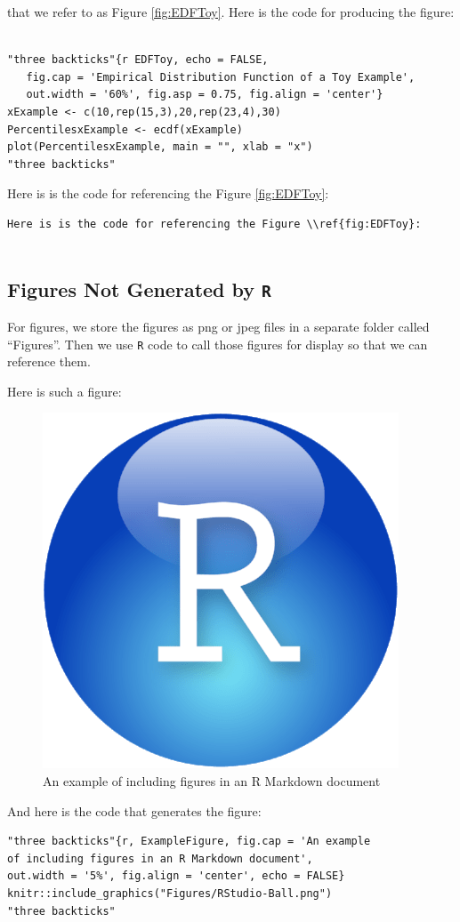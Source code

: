 \documentclass[]{book}
\theoremstyle{definition}
\theoremstyle{definition}
\theoremstyle{definition}
\theoremstyle{remark}
\begin{document}
that we refer to as Figure \ref{fig:EDFToy}. Here is the code for
producing the figure:

\begin{verbatim}

"three backticks"{r EDFToy, echo = FALSE, 
   fig.cap = 'Empirical Distribution Function of a Toy Example',
   out.width = '60%', fig.asp = 0.75, fig.align = 'center'}
xExample <- c(10,rep(15,3),20,rep(23,4),30)
PercentilesxExample <- ecdf(xExample)
plot(PercentilesxExample, main = "", xlab = "x")
"three backticks"
\end{verbatim}

Here is is the code for referencing the Figure \ref{fig:EDFToy}:

\begin{verbatim}
Here is is the code for referencing the Figure \\ref{fig:EDFToy}:
    
\end{verbatim}

\subsection{\texorpdfstring{Figures Not Generated by
\texttt{R}}{Figures Not Generated by R}}\label{figures-not-generated-by-r}

For figures, we store the figures as png or jpeg files in a separate
folder called ``Figures''. Then we use \texttt{R} code to call those
figures for display so that we can reference them.

Here is such a figure:

\begin{figure}

{\centering \includegraphics[width=0.05\linewidth]{Figures/RStudio-Ball} 

}

\caption{An example of including figures in an R Markdown document}\label{fig:ExampleFigure}
\end{figure}

And here is the code that generates the figure:

\begin{verbatim}
"three backticks"{r, ExampleFigure, fig.cap = 'An example 
of including figures in an R Markdown document', 
out.width = '5%', fig.align = 'center', echo = FALSE}
knitr::include_graphics("Figures/RStudio-Ball.png")
"three backticks"
\end{verbatim}
\end{document}
